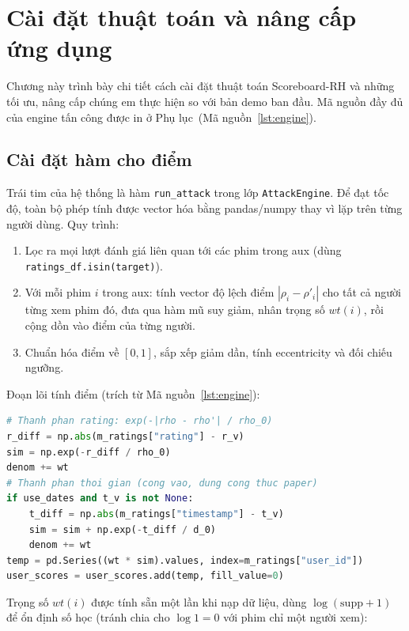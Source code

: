 \chapter{Cài đặt thuật toán và nâng cấp ứng dụng}
\label{chap:impl}

Chương này trình bày chi tiết cách cài đặt thuật toán Scoreboard-RH và những tối ưu, nâng cấp chúng em thực hiện so với bản demo ban đầu. Mã nguồn đầy đủ của engine tấn công được in ở Phụ lục~(Mã nguồn~\ref{lst:engine}).

\section{Cài đặt hàm cho điểm}

Trái tim của hệ thống là hàm \texttt{run\_attack} trong lớp \texttt{AttackEngine}. Để đạt tốc độ, toàn bộ phép tính được vector hóa bằng pandas/numpy thay vì lặp trên từng người dùng. Quy trình:

\begin{enumerate}[1.]
	\item Lọc ra mọi lượt đánh giá liên quan tới các phim trong aux (dùng \texttt{ratings\_df}\allowbreak\texttt{.isin(target)}).
	\item Với mỗi phim $i$ trong aux: tính vector độ lệch điểm $|\rho_i - \rho'_i|$ cho tất cả người từng xem phim đó, đưa qua hàm mũ suy giảm, nhân trọng số $wt(i)$, rồi cộng dồn vào điểm của từng người.
	\item Chuẩn hóa điểm về $[0,1]$, sắp xếp giảm dần, tính eccentricity và đối chiếu ngưỡng.
\end{enumerate}

Đoạn lõi tính điểm (trích từ Mã nguồn~\ref{lst:engine}):

\begin{lstlisting}[language=Python]
# Thanh phan rating: exp(-|rho - rho'| / rho_0)
r_diff = np.abs(m_ratings["rating"] - r_v)
sim = np.exp(-r_diff / rho_0)
denom += wt
# Thanh phan thoi gian (cong vao, dung cong thuc paper)
if use_dates and t_v is not None:
    t_diff = np.abs(m_ratings["timestamp"] - t_v)
    sim = sim + np.exp(-t_diff / d_0)
    denom += wt
temp = pd.Series((wt * sim).values, index=m_ratings["user_id"])
user_scores = user_scores.add(temp, fill_value=0)
\end{lstlisting}

Trọng số $wt(i)$ được tính sẵn một lần khi nạp dữ liệu, dùng $\log(\mathrm{supp}+1)$ để ổn định số học (tránh chia cho $\log 1 = 0$ với phim chỉ một người xem):

